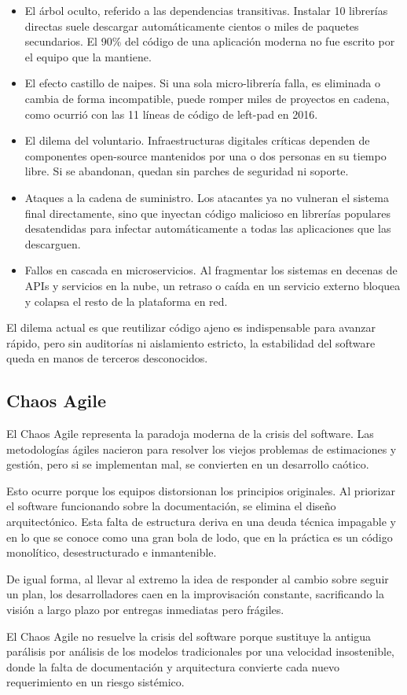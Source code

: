 \documentclass{./plantilla/umss}
\begin{document}
\begin{itemize}
    \item El árbol oculto, referido a las dependencias transitivas. Instalar 10 librerías directas suele descargar automáticamente cientos o miles de paquetes secundarios. El 90\% del código de una aplicación moderna no fue escrito por el equipo que la mantiene.
    \item El efecto castillo de naipes. Si una sola micro-librería falla, es eliminada o cambia de forma incompatible, puede romper miles de proyectos en cadena, como ocurrió con las 11 líneas de código de left-pad en 2016.
    \item El dilema del voluntario. Infraestructuras digitales críticas dependen de componentes open-source mantenidos por una o dos personas en su tiempo libre. Si se abandonan, quedan sin parches de seguridad ni soporte.
    \item Ataques a la cadena de suministro. Los atacantes ya no vulneran el sistema final directamente, sino que inyectan código malicioso en librerías populares desatendidas para infectar automáticamente a todas las aplicaciones que las descarguen.
    \item Fallos en cascada en microservicios. Al fragmentar los sistemas en decenas de APIs y servicios en la nube, un retraso o caída en un servicio externo bloquea y colapsa el resto de la plataforma en red.
\end{itemize}

El dilema actual es que reutilizar código ajeno es indispensable para avanzar rápido, pero sin auditorías ni aislamiento estricto, la estabilidad del software queda en manos de terceros desconocidos.

\subsection{Chaos Agile}

El Chaos Agile representa la paradoja moderna de la crisis del software. Las metodologías ágiles nacieron para resolver los viejos problemas de estimaciones y gestión, pero si se implementan mal, se convierten en un desarrollo caótico.

Esto ocurre porque los equipos distorsionan los principios originales. Al priorizar el software funcionando sobre la documentación, se elimina el diseño arquitectónico. Esta falta de estructura deriva en una deuda técnica impagable y en lo que se conoce como una gran bola de lodo, que en la práctica es un código monolítico, desestructurado e inmantenible.

De igual forma, al llevar al extremo la idea de responder al cambio sobre seguir un plan, los desarrolladores caen en la improvisación constante, sacrificando la visión a largo plazo por entregas inmediatas pero frágiles.

El Chaos Agile no resuelve la crisis del software porque sustituye la antigua parálisis por análisis de los modelos tradicionales por una velocidad insostenible, donde la falta de documentación y arquitectura convierte cada nuevo requerimiento en un riesgo sistémico.
\end{document}
